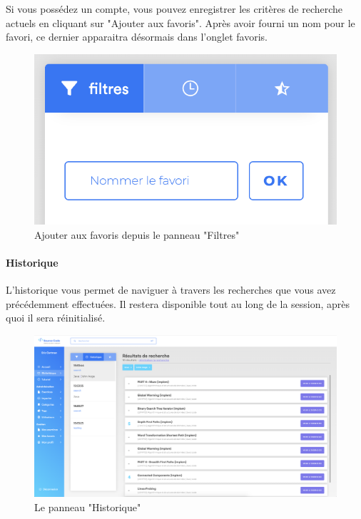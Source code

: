 Si vous possédez un compte, vous pouvez enregistrer les critères de recherche actuels en cliquant sur "Ajouter aux favoris". Après avoir fourni un nom pour le favori, ce dernier apparaitra désormais dans l'onglet favoris.\\

\begin{figure}[H]
    \includegraphics[width=\textwidth,height=0.1\textheight,keepaspectratio]{images/client/add-favorite.png}
    \centering
    \caption[SourceCode : Ajouter aux favoris depuis le panneau "Filtres"]{Ajouter aux favoris depuis le panneau "Filtres"}
\end{figure}

\paragraph{Historique} L'historique vous permet de naviguer à travers les recherches que vous avez précédemment effectuées. Il restera disponible tout au long de la session, après quoi il sera réinitialisé.\\

\begin{figure}[H]
    \includegraphics[width=\textwidth,height=\textheight,keepaspectratio]{images/client/historical.png}
    \centering
    \caption[SourceCode : le panneau "Historique"]{Le panneau "Historique"}
\end{figure}

